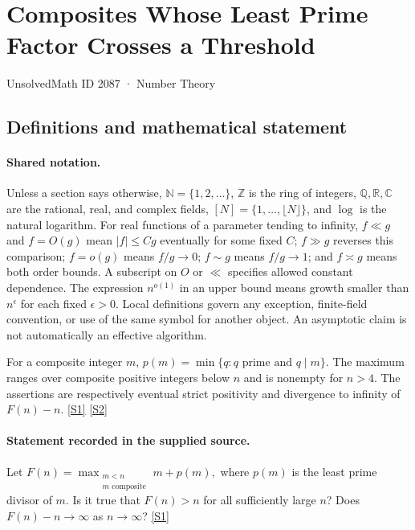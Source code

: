 \documentclass[11pt,a4paper]{article}
\newcommand{\N}{\mathbb{N}}
\newcommand{\Z}{\mathbb{Z}}
\newcommand{\Q}{\mathbb{Q}}
\newcommand{\R}{\mathbb{R}}
\newcommand{\C}{\mathbb{C}}
\newcommand{\sref}[2]{\hyperlink{source:#1:#2}{[S#2]}}
\begin{document}

\setcounter{section}{2086}

\section{Composites Whose Least Prime Factor Crosses a Threshold}\label{2087}

{\small\sffamily UnsolvedMath ID 2087 · Number Theory}

\subsection{Definitions and mathematical statement}

\paragraph{Shared notation.}Unless a section says otherwise, $\N=\{1,2,\ldots\}$,
$\Z$ is the ring of integers, $\Q,\R,\C$ are the rational, real, and complex
fields, $[N]=\{1,\ldots,\lfloor N\rfloor\}$, and $\log$ is the natural
logarithm. For real functions of a parameter tending to infinity,
$f\ll g$ and $f=O(g)$ mean $|f|\leq Cg$ eventually for some fixed $C$;
$f\gg g$ reverses this comparison; $f=o(g)$ means $f/g\to0$;
$f\sim g$ means $f/g\to1$; and $f\asymp g$ means both order bounds.
A subscript on $O$ or $\ll$ specifies allowed constant dependence.
The expression $n^{o(1)}$ in an upper bound means growth smaller than
$n^\epsilon$ for each fixed $\epsilon>0$. Local definitions govern any
exception, finite-field convention, or use of the same symbol for another
object. An asymptotic claim is not automatically an effective algorithm.



For a composite integer $m$, $p(m)=\min\{q:q\text{ prime and }q\mid m\}$. The maximum ranges over composite positive integers below $n$ and is nonempty for $n>4$. The assertions are respectively eventual strict positivity and divergence to infinity of $F(n)-n$. \sref{2087}{1} \sref{2087}{2}

\paragraph{Statement recorded in the supplied source.}
Let $ F(n) = \max_{\substack{m<n\\ m\textrm{ composite}}} m+p(m), $ where $p(m)$ is the least prime divisor of $m$. Is it true that $F(n)>n$ for all sufficiently large $n$? Does $F(n)-n\to \infty$ as $n\to\infty$? \sref{2087}{1}
\end{document}
